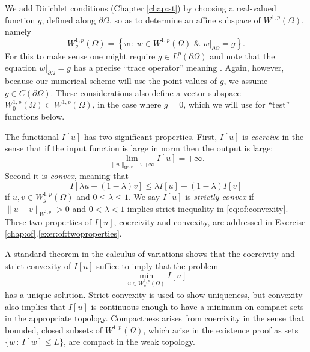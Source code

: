 We add Dirichlet conditions (Chapter \ref{chap:st}) by choosing a real-valued function $g$, defined along $\partial \Omega$, so as to determine an affine subspace of $W^{1,p}(\Omega)$, namely
\begin{equation}
    W_g^{1,p}(\Omega) = \left\{w \,:\, w \in W^{1,p}(\Omega) \,\, \& \,\, w\big|_{\partial \Omega} = g\right\}.  \label{eq:of:affinedirichlet}
\end{equation}
For this to make sense one might require $g \in L^p(\partial \Omega)$ and note that the equation $w\big|_{\partial \Omega} = g$ has a precise ``trace operator'' meaning \citep[section 5.5]{Evans2010}.  Again, however, because our numerical scheme will use the point values of $g$, we assume $g\in C(\partial\Omega)$.  These considerations also define a vector subspace $W_0^{1,p}(\Omega) \subset W^{1,p}(\Omega)$, in the case where $g=0$, which we will use for ``test'' functions below.

The functional $I[u]$ has two significant properties.  First, $I[u]$ is \emph{coercive} in the sense that if the input function is large in norm then the output is large:
\begin{equation}
\lim_{\|u\|_{W^{1,p}} \to +\infty} I[u] = +\infty.   \label{eq:of:coercivity}
\end{equation}
Second it is \emph{convex}, meaning that
\begin{equation}
I[\lambda u + (1-\lambda) v] \le \lambda I[u] + (1-\lambda) I[v]    \label{eq:of:convexity}
\end{equation}
if $u,v\in W_g^{1,p}(\Omega)$ and $0 \le \lambda \le 1$.  We say $I[u]$ is \emph{strictly convex} if $\|u-v\|_{W^{1,p}} > 0$ and $0 < \lambda < 1$ implies strict inequality in \eqref{eq:of:convexity}.  These two properties of $I[u]$, coercivity and convexity, are addressed in Exercise \ref{chap:of}.\ref{exer:of:twoproperties}.

A standard theorem in the calculus of variations \citep[Theorem 8.2.2]{Evans2010} shows that the coercivity and strict convexity of $I[u]$ suffice to imply that the problem
\begin{equation}
\min_{u \in W_g^{1,p}(\Omega)} I[u] \label{eq:of:plapmin}
\end{equation}
has a unique solution.  Strict convexity is used to show uniqueness, but convexity also implies that $I[u]$ is continuous enough to have a minimum on compact sets in the appropriate topology.  Compactness arises from coercivity in the sense that bounded, closed subsets of $W^{1,p}(\Omega)$, which arise in the existence proof as sets $\{w\,:\,I[w] \le L\}$, are compact in the weak topology.

